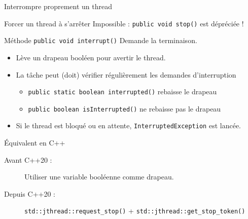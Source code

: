 
\begingroup

\begin{frame}[fragile]{Interrompre proprement un thread}

  \begin{alertblock}{Forcer un thread à s'arrêter}
    Impossible : \lstinline|public void stop()| est dépréciée !
  \end{alertblock}

  \vfill

  \begin{block}{Méthode \lstinline|public void interrupt()|}
    Demande la terminaison.
    \begin{itemize}
    \item Lève un drapeau booléen pour avertir le thread.
    \item La tâche peut (doit) vérifier régulièrement les demandes d'interruption
      \begin{itemize}
      \item \lstinline|public static boolean interrupted()| \hfill rebaisse le drapeau
      \item \lstinline|public boolean isInterrupted()|      \hfill ne rebaisse pas le drapeau
      \end{itemize}
    \item Si le thread est bloqué ou en attente,  \lstinline|InterruptedException| est lancée.
    \end{itemize}
  \end{block}

  \vfill

  \begin{exampleblock}{Équivalent en C++}
    \begin{description}
    \item[Avant C++20 :] Utiliser une variable booléenne  comme drapeau.
    \item[Depuis C++20 :] \lstinline{std::jthread::request_stop()} + \lstinline{std::jthread::get_stop_token()}
    \end{description}
  \end{exampleblock}

\end{frame}

\endgroup
\endinput
